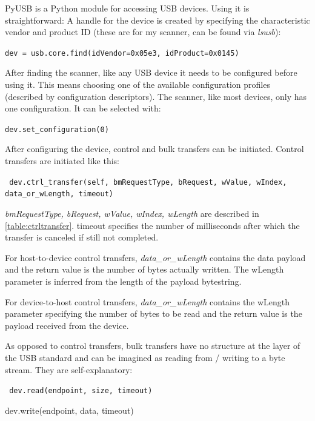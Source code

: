 \documentclass{article}
\begin{document}
PyUSB \cite{pyusb} is a Python module for accessing USB devices.
Using it is straightforward:
A handle for the device is created by specifying the characteristic
vendor and product ID (these are for my scanner, can be found via {\it lsusb}):

\begin{center}
\tt dev = usb.core.find(idVendor=0x05e3, idProduct=0x0145)
\end{center}

After finding the scanner, like any USB device it needs to be configured
before using it. This means choosing one of the available configuration
profiles (described by configuration descriptors). The scanner, like most
devices, only has one configuration. It can be selected with:

\begin{center}
\tt dev.set\_configuration(0)
\end{center}

After configuring the device, control and bulk transfers can be initiated.
Control transfers are initiated like this:

\begin{center}
\tt
dev.ctrl\_transfer(self, bmRequestType, bRequest, wValue, wIndex, data\_or\_wLength, timeout)
\end{center}

{\it bmRequestType, bRequest, wValue, wIndex, wLength} are described in \autoref{table:ctrltransfer}.
timeout specifies the number of milliseconds after which the transfer is canceled if
still not completed.

For host-to-device control transfers, {\it data\_or\_wLength} contains the data payload
and the return value is the number of bytes actually written. The wLength parameter
is inferred from the length of the payload bytestring.

For device-to-host control transfers, {\it data\_or\_wLength} contains the wLength
parameter specifying the number of bytes to be read and the return value is the payload
received from the device.

As opposed to control transfers, bulk transfers have no structure at the layer
of the USB standard and can be imagined as reading from / writing to a byte stream.
They are self-explanatory:

\begin{center}
\tt
dev.read(endpoint, size, timeout)

dev.write(endpoint, data, timeout)
\end{center}
\end{document}
